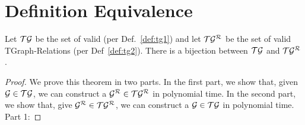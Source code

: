 \appendix 

\section{Definition Equivalence}

\begin{theorem}
Let ${\cal TG}$ be the set of valid \tgs (per Def.~\ref{def:tg1}) and let
${\cal TG^R}$ be the set of valid TGraph-Relations (per
Def~\ref{def:tg2}).  There is a bijection between ${\cal TG}$ and ${\cal
  TG^R}$.
\label{tgr_tg}
\end{theorem}

\begin{proof}
  We prove this theorem in two parts.  In the first part, we show
  that, given ${\cal G} \in {\cal TG}$, we can construct a ${\cal G^R}
  \in {\cal TG^R}$ in polynomial time.  In the second part, we show
  that, give ${\cal G^R} \in {\cal TG^R}$, we can construct a ${\cal
    G} \in {\cal TG}$ in polynomial time.
\\
Part 1:


\end{proof}
